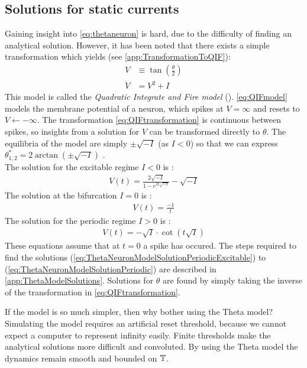 \subsection{Solutions for static currents} \label{sec:TheThetaNeuronModelSolutionPeriodics}
Gaining insight into \eqref{eq:thetaneuron} is hard, due to the difficulty of finding an analytical solution. However, it has been noted that there exists a simple transformation which yields (see \ref{app:TransformationToQIF}):
\begin{align}
V &\equiv \tan \left( \frac{\theta}{2} \right) \label{eq:QIFtransformation} \\
\dot{V} &= V^2 + I \label{eq:QIFmodel}
\end{align}
This model is called the \textsl{Quadratic Integrate and Fire model} (\QIF). \eqref{eq:QIFmodel} models the membrane potential of a neuron, which spikes at $V=\infty$ and resets to $V \leftarrow -\infty$. The transformation \eqref{eq:QIFtransformation} is continuous between spikes, so insights from a solution for $V$ can be transformed directly to $\theta$. The equilibria of the \QIF model are simply $\pm \sqrt{-I}$ (as $I < 0$) so that we can express $\theta^{\ast}_{1, 2} = 2 \arctan \left( \pm \sqrt{-I} \right)$ \cite{Gutkin2014}. \\

The solution for the excitable regime $I < 0$ is :
\begin{align}
V(t) = \frac{2 \sqrt{-I}}{1 - e^{2 t \sqrt{-I}}}-\sqrt{-I} \label{eq:ThetaNeuronModelSolutionPeriodicExcitable}
\end{align}
The solution at the bifurcation $I = 0$ is :
\begin{align}
V(t) = \frac{-1}{t} \label{eq:ThetaNeuronModelSolutionPeriodicBifurcation}
\end{align}
The solution for the periodic regime $I > 0$ is :
\begin{align}
V(t) = -\sqrt{I} \cdot \cot (t \sqrt{I}) \label{eq:ThetaNeuronModelSolutionPeriodic}
\end{align}
These equations assume that at $t=0$ a spike has occured. The steps required to find the solutions (\ref{eq:ThetaNeuronModelSolutionPeriodicExcitable}) to (\ref{eq:ThetaNeuronModelSolutionPeriodic}) are described in \ref{app:ThetaModelSolutions}. Solutions for $\theta$ are found by simply taking the inverse of the transformation in \eqref{eq:QIFtransformation}.

If the \QIF model is so much simpler, then why bother using the Theta model? Simulating the \QIF model requires an artificial reset threshold, because we cannot expect a computer to represent infinity easily. Finite thresholds make the analytical solutions more difficult and convoluted. By using the Theta model the dynamics remain smooth and bounded on ${\mathbb{T}}$. %


